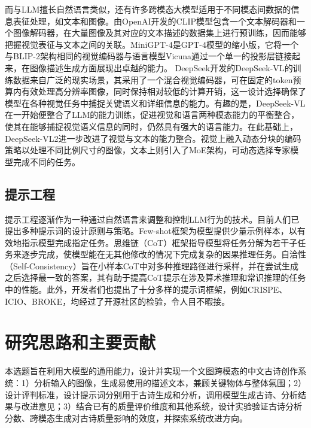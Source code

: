 而与LLM擅长自然语言类似，还有许多跨模态大模型适用于不同模态间数据的信息表征处理，如文本和图像。由OpenAI开发的CLIP模型\cite{radfordLearningTransferableVisual2021}包含一个文本解码器和一个图像解码器，在大量图像及其对应的文本描述的数据集上进行预训练，因而能够把握视觉表征与文本之间的关联。MiniGPT-4\cite{zhuMiniGPT4EnhancingVisionLanguage2023}是GPT-4模型的缩小版，它将一个与BLIP-2架构相同的视觉编码器与语言模型Vicuna通过一个单一的投影层链接起来，在图像描述生成方面展现出卓越的能力。
DeepSeek开发的DeepSeek-VL\cite{luDeepSeekVLRealWorldVisionLanguage2024}的训练数据来自广泛的现实场景，其采用了一个混合视觉编码器，可在固定的token预算内有效处理高分辨率图像，同时保持相对较低的计算开销，这一设计选择确保了模型在各种视觉任务中捕捉关键语义和详细信息的能力。有趣的是，DeepSeek-VL在一开始便整合了LLM的能力训练，促进视觉和语言两种模态能力的平衡整合，使其在能够捕捉视觉语义信息的同时，仍然具有强大的语言能力。在此基础上，DeepSeek-VL2\cite{wuDeepSeekVL2MixtureofExpertsVisionLanguage2024}进一步改进了视觉与文本的能力整合。视觉上融入动态分块的编码策略以处理不同比例尺寸的图像，文本上则引入了MoE架构，可动态选择专家模型完成不同的任务。

\subsection{提示工程}
提示工程逐渐作为一种通过自然语言来调整和控制LLM行为的技术。目前人们已提出多种提示词的设计原则与策略。Few-shot框架\cite{brownLanguageModelsAre2020}为模型提供少量示例样本，以有效地指示模型完成指定任务。思维链（CoT）框架\cite{weiChainofThoughtPromptingElicits2022}指导模型将任务分解为若干子任务来逐步完成，使模型能在无其他修改的情况下完成复杂的因果推理任务。自洽性（Self-Consistency）\cite{wangSelfConsistencyImprovesChain2023a}旨在小样本CoT中对多种推理路径进行采样，并在尝试生成之后选择最一致的答案，其有助于提高CoT提示在涉及算术推理和常识推理的任务中的性能。此外，开发者们也提出了十分多样的提示词框架，例如CRISPE、ICIO、BROKE，均经过了开源社区的检验，令人目不暇接。

\section{研究思路和主要贡献}

本选题旨在利用大模型的通用能力，设计并实现一个文图跨模态的中文古诗创作系统：1）分析输入的图像，生成易使用的描述文本，兼顾关键物体与整体氛围；2）设计评判标准，设计提示词分别用于古诗生成和分析，调用模型生成古诗、分析结果与改进意见；3）结合已有的质量评价维度和其他系统，设计实验验证古诗分析分数、跨模态生成对古诗质量影响的效度，并探索系统改进方向。

